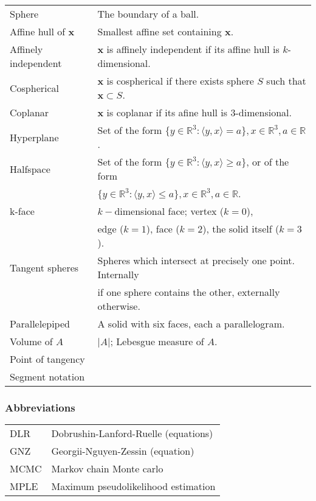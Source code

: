 \documentclass[12pt,a4paper]{report}
\newcommand{\Rt}{{\mathbb R^3}}
\theoremstyle{definition}
\theoremstyle{remark}
\theoremstyle{theorem}
\theoremstyle{remark}
\newcommand{\x}{{\mathbf{x}}}
\begin{document}
\hspace*{-0.8cm}
\begin{tabular}{ l l }
	Sphere & The boundary of a ball. \\
	Affine hull of $\x$ & Smallest affine set containing $\x$. \\
	Affinely independent & $\x$ is affinely independent if its affine hull is $k$-dimensional.\\ 
	Cospherical & $\x$ is cospherical if there exists sphere $S$ such that $\x \subset S$. \\ 
	Coplanar & $\x$ is coplanar if its afine hull is $3$-dimensional. \\
	Hyperplane  & Set of the form $\{y\in \Rt: \langle y, x \rangle = a\}, x\in \Rt, a\in \mathbb R$.\\
	Halfspace & Set of the form $\{y\in \Rt: \langle y, x \rangle \geq a\}$, or of the form \\
	& $\{y\in \Rt: \langle y, x \rangle \leq a\}, x\in \Rt, a\in \mathbb R$. \\ 
	k-face & $k-$dimensional face; vertex ($k=0$), \\
	& edge ($k=1$), face ($k=2$), the solid itself ($k=3$).\\
	Tangent spheres& Spheres which intersect at precisely one point. Internally \\
	& if one sphere contains the other, externally otherwise. \\
	Parallelepiped & A solid with six faces, each a parallelogram. \\
	Volume of $A$  & $|A|$; Lebesgue measure of $A$. \\
Point of tangency  \\
Segment notation & \\
\end{tabular}


\subsubsection{Abbreviations}
\begin{tabular}{ l l }
	DLR & Dobrushin-Lanford-Ruelle (equations) \\
	GNZ & Georgii-Nguyen-Zessin (equation) \\
	MCMC & Markov chain Monte carlo \\
	MPLE & Maximum pseudolikelihood estimation
\end{tabular}











\end{document}
